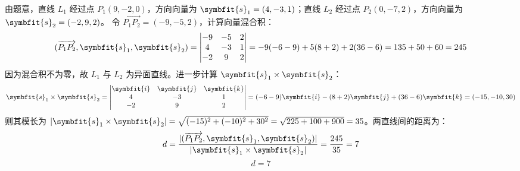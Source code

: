\begin{solution}
    由题意，直线 $L_1$ 经过点 $P_1(9, -2, 0)$，方向向量为 $\symbfit{s}_1 = (4, -3, 1)$；直线 $L_2$ 经过点 $P_2(0, -7, 2)$，方向向量为 $\symbfit{s}_2 = (-2, 9, 2)$。
    令 $\overrightarrow{P_1P_2} = (-9, -5, 2)$，计算向量混合积：
    \begin{equation*}
        (\overrightarrow{P_1P_2}, \symbfit{s}_1, \symbfit{s}_2) = \begin{vmatrix} -9 & -5 & 2 \\ 4 & -3 & 1 \\ -2 & 9 & 2 \end{vmatrix} = -9(-6 - 9) + 5(8 + 2) + 2(36 - 6) = 135 + 50 + 60 = 245
    \end{equation*}
    因为混合积不为零，故 $L_1$ 与 $L_2$ 为异面直线。进一步计算 $\symbfit{s}_1 \times \symbfit{s}_2$：
    \begin{equation*}
        \symbfit{s}_1 \times \symbfit{s}_2 = \begin{vmatrix} \symbfit{i} & \symbfit{j} & \symbfit{k} \\ 4 & -3 & 1 \\ -2 & 9 & 2 \end{vmatrix} = (-6 - 9)\symbfit{i} - (8 + 2)\symbfit{j} + (36 - 6)\symbfit{k} = (-15, -10, 30)
    \end{equation*}
    则其模长为 $|\symbfit{s}_1 \times \symbfit{s}_2| = \sqrt{(-15)^2 + (-10)^2 + 30^2} = \sqrt{225 + 100 + 900} = 35$。两直线间的距离为：
    \begin{equation*}
        d = \frac{|(\overrightarrow{P_1P_2}, \symbfit{s}_1, \symbfit{s}_2)|}{|\symbfit{s}_1 \times \symbfit{s}_2|} = \frac{245}{35} = 7
    \end{equation*}
    \begin{equation*}
        \boxed{d = 7}
    \end{equation*}


\end{solution}
